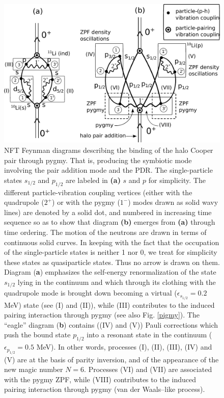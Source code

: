 \begin{subappendices}
   \begin{figure}
   \centerline{\includegraphics*[width=17cm,angle=0]{nutshell/figs/VdW.pdf}}\caption{NFT Feynman diagrams describing the binding of the halo Cooper pair through pygmy. That is, producing the symbiotic mode involving the pair addition mode and the PDR. The single-particle states $s_{1/2}$ and $p_{1/2}$ are labeled in \textbf{(a)} $s$ and $p$ for simplicity. The different particle-vibration coupling vertices (either with the quadrupole ($2^+$) or with the pygmy ($1^-$) modes drawn as solid wavy lines) are denoted by a solid dot, and numbered in increasing time sequence so as to show that diagram \textbf{(b)} emerges from \textbf{(a)} through time ordering. The motion of the neutrons are drawn in terms of continuous solid curves. In keeping with the fact that the occupation of the single-particle states is neither 1 nor 0, we treat for simplicity these states  as quasiparticle states. Thus no arrow is drawn on them. Diagram (\textbf{a}) emphasizes the self-energy renormalization of the state $s_{1/2}$ lying in the continuum and which   through its clothing with the quadrupole mode is brought down becoming a virtual ($\epsilon_{s_{1/2}}=0.2$ MeV) state (see (I) and (II)), while (III) contributes to the induced pairing interaction through pygmy (see also Fig. \ref{pigmy}). The ``eagle'' diagram (\textbf{b}) contains ((IV) and (V)) Pauli corrections which push the bound state $p_{1/2}$ into a resonant state in the continuum ($\epsilon_{p_{1/2}}=0.5$ MeV). In other words, processes (I), (II), (III), (IV) and (V) are at the basis of parity inversion, and of the appearance of the new magic number $N=6$. Processes (VI) and (VII) are associated with the pygmy ZPF, while (VIII) contributes to the induced pairing interaction through pygmy (van der Waals--like process).}\label{fig2.A.1}
   \end{figure}
 

\end{subappendices}
